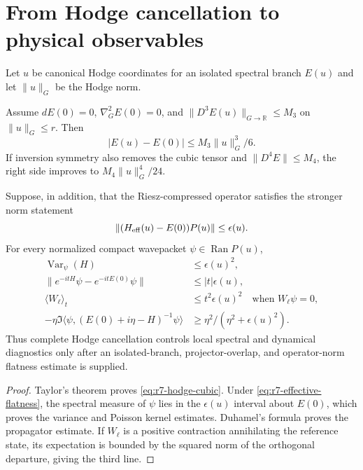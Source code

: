 \section{From Hodge cancellation to physical observables}
\label{sec:r7-hodge-bridge}

Let $u$ be canonical Hodge coordinates for an isolated spectral branch
$E(u)$ and let $\|u\|_G$ be the Hodge norm.

\begin{theorem}
\label{thm:r7-hodge-bridge}
Assume $dE(0)=0$, $\nabla_G^2E(0)=0$, and
$\|D^3E(u)\|_{G\to\mathbb R}\le M_3$ on $\|u\|_G\le r$.  Then
\begin{equation}
 |E(u)-E(0)|\le M_3\|u\|_G^3/6.
 \label{eq:r7-hodge-cubic}
\end{equation}
If inversion symmetry also removes the cubic tensor and
$\|D^4E\|\le M_4$, the right side improves to
$M_4\|u\|_G^4/24$.

Suppose, in addition, that the Riesz-compressed operator satisfies the
stronger norm statement
\begin{equation}
 \|(H_{\rm eff}(u)-E(0))P(u)\|\le\epsilon(u).
 \label{eq:r7-effective-flatness}
\end{equation}
For every normalized compact wavepacket $\psi\in\operatorname{Ran}P(u)$,
\begin{align}
 \operatorname{Var}_\psi(H)&\le\epsilon(u)^2,\\
 \|e^{-itH}\psi-e^{-itE(0)}\psi\|&\le |t|\epsilon(u),\\
 \langle W_\ell\rangle_t&\le t^2\epsilon(u)^2
 \quad\text{when }W_\ell\psi=0,\\
 -\eta\Im\langle\psi,(E(0)+i\eta-H)^{-1}\psi\rangle
 &\ge\eta^2/(\eta^2+\epsilon(u)^2).
 \label{eq:r7-hodge-observables}
\end{align}
Thus complete Hodge cancellation controls local spectral and dynamical
diagnostics only after an isolated-branch, projector-overlap, and operator-norm
flatness estimate is supplied.
\end{theorem}

\begin{proof}
Taylor's theorem proves \eqref{eq:r7-hodge-cubic}.  Under
\eqref{eq:r7-effective-flatness}, the spectral measure of $\psi$ lies in the
$\epsilon(u)$ interval about $E(0)$, which proves the variance and Poisson
kernel estimates.  Duhamel's formula proves the propagator estimate.  If
$W_\ell$ is a positive contraction annihilating the reference state, its
expectation is bounded by the squared norm of the orthogonal departure,
giving the third line.
\end{proof}

